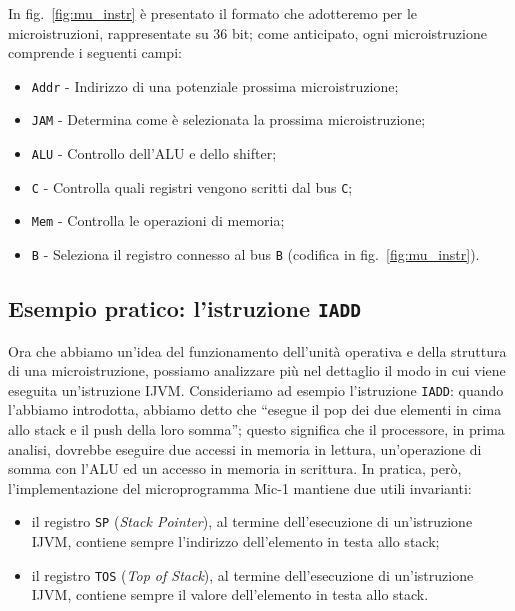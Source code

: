 \documentclass[a4paper,12pt]{scrreprt}
\begin{document}
In fig.~\ref{fig:mu_instr} è presentato il formato che adotteremo per le
microistruzioni, rappresentate su 36 bit; come anticipato, ogni microistruzione
comprende i seguenti campi:
\begin{itemize}
  \item \lstinline{Addr} - Indirizzo di una potenziale prossima microistruzione;
  \item \lstinline{JAM} - Determina come è selezionata la prossima
  microistruzione;
  \item \lstinline{ALU} - Controllo dell'ALU e dello shifter;
  \item \lstinline{C} - Controlla quali registri vengono scritti dal bus
  \lstinline{C};
  \item \lstinline{Mem} - Controlla le operazioni di memoria;
  \item \lstinline{B} - Seleziona il registro connesso al bus \lstinline{B}
  (codifica in fig.~\ref{fig:mu_instr}).
\end{itemize}

\subsection{Esempio pratico: l'istruzione \lstinline{IADD}}

Ora che abbiamo un'idea del funzionamento dell'unità operativa e della struttura
di una microistruzione, possiamo analizzare più nel dettaglio il modo in cui
viene eseguita un'istruzione IJVM. Consideriamo ad esempio l'istruzione
\lstinline{IADD}: quando l'abbiamo introdotta, abbiamo detto che ``esegue il pop
dei due elementi in cima allo stack e il push della loro somma''; questo
significa che il processore, in prima analisi, dovrebbe eseguire due accessi in
memoria in lettura, un'operazione di somma con l'ALU ed un accesso in memoria in
scrittura. In pratica, però, l'implementazione del microprogramma Mic-1 mantiene
due utili invarianti:
\begin{itemize}
  \item il registro \lstinline{SP} (\textit{Stack Pointer}), al termine dell'esecuzione
  di un'istruzione IJVM, contiene sempre l'indirizzo dell'elemento in testa allo
  stack;
  \item il registro \lstinline{TOS} (\textit{Top of Stack}), al termine dell'esecuzione
  di un'istruzione IJVM, contiene sempre il valore dell'elemento in testa allo
  stack.
\end{itemize}
\end{document}
